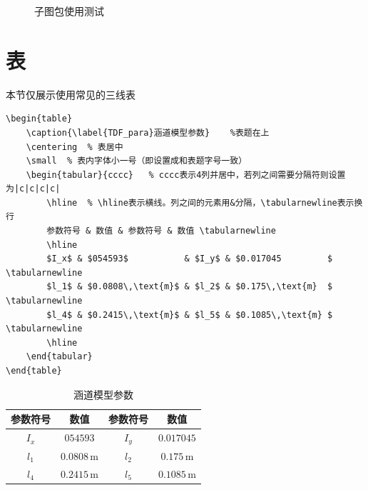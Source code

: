 \begin{figure}[!h]
{		\label{Fig:1:c}}
	\caption{子图包使用测试}\label{Fig:1}
\end{figure}

\section{表}
本节仅展示使用常见的三线表
\begin{lstlisting}
\begin{table}
	\caption{\label{TDF_para}涵道模型参数}	%表题在上
	\centering	% 表居中
	\small	% 表内字体小一号（即设置成和表题字号一致）
	\begin{tabular}{cccc}	% cccc表示4列并居中，若列之间需要分隔符则设置为|c|c|c|c|
		\hline	% \hline表示横线。列之间的元素用&分隔，\tabularnewline表示换行
		参数符号 & 数值 & 参数符号 & 数值 \tabularnewline 
		\hline 
		$I_x$ & $054593$ 		   & $I_y$ & $0.017045         $ \tabularnewline
		$l_1$ & $0.0808\,\text{m}$ & $l_2$ & $0.175\,\text{m}  $ \tabularnewline 
		$l_4$ & $0.2415\,\text{m}$ & $l_5$ & $0.1085\,\text{m} $ \tabularnewline
		\hline 
	\end{tabular}
\end{table}
\end{lstlisting}
\begin{table}
	\caption{\label{TDF_para}涵道模型参数}
	\centering
	\small 
	\begin{tabular}{cccc}
		\hline 
		参数符号 & 数值                & 参数符号 & 数值                 \tabularnewline
		\hline 
		$I_x$   & $054593$ 		     & $I_y$   & $0.017045         $ \tabularnewline
		$l_1$   & $0.0808\,\text{m}$ & $l_2$   & $0.175\,\text{m}  $ \tabularnewline 
		$l_4$   & $0.2415\,\text{m}$ & $l_5$   & $0.1085\,\text{m} $ \tabularnewline
		\hline 
	\end{tabular}
\end{table}

